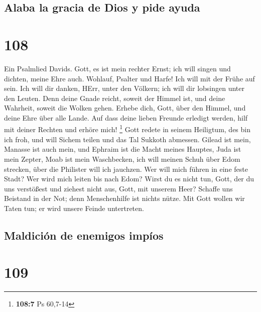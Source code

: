 \hypertarget{alaba-la-gracia-de-dios-y-pide-ayuda}{%
\subsection{Alaba la gracia de Dios y pide
ayuda}\label{alaba-la-gracia-de-dios-y-pide-ayuda}}

\hypertarget{section-107}{%
\section{108}\label{section-107}}

 Ein Psalmlied Davids.  Gott, es ist mein
rechter Ernst; ich will singen und dichten, meine Ehre auch.
 Wohlauf, Psalter und Harfe! Ich will mit der Frühe auf
sein.  Ich will dir danken, HErr, unter den Völkern; ich
will dir lobsingen unter den Leuten.  Denn deine Gnade
reicht, soweit der Himmel ist, und deine Wahrheit, soweit die Wolken
gehen.  Erhebe dich, Gott, über den Himmel, und deine Ehre
über alle Lande.  Auf dass deine lieben Freunde erledigt
werden, hilf mit deiner Rechten und erhöre mich! \footnote{\textbf{108:7}
  Ps 60,7-14}  Gott redete in seinem Heiligtum, des bin
ich froh, und will Sichem teilen und das Tal Sukkoth abmessen.
 Gilead ist mein, Manasse ist auch mein, und Ephraim ist
die Macht meines Hauptes, Juda ist mein Zepter,  Moab ist
mein Waschbecken, ich will meinen Schuh über Edom strecken, über die
Philister will ich jauchzen.  Wer will mich führen in
eine feste Stadt? Wer wird mich leiten bis nach Edom? 
Wirst du es nicht tun, Gott, der du uns verstößest und ziehest nicht
aus, Gott, mit unserem Heer?  Schaffe uns Beistand in der
Not; denn Menschenhilfe ist nichts nütze.  Mit Gott
wollen wir Taten tun; er wird unsere Feinde untertreten.

\hypertarget{maldiciuxf3n-de-enemigos-impuxedos}{%
\subsection{Maldición de enemigos
impíos}\label{maldiciuxf3n-de-enemigos-impuxedos}}

\hypertarget{section-108}{%
\section{109}\label{section-108}}


